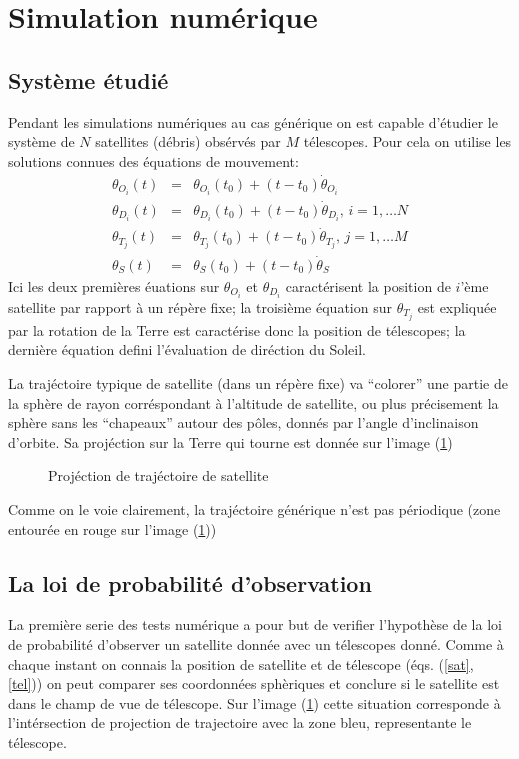 
\section{Simulation numérique}

\subsection{Système étudié}
Pendant les simulations numériques au cas générique on est capable 
d'étudier le système de $N$ satellites (débris) obsérvés par $M$
télescopes. Pour cela on utilise les solutions connues des équations 
de mouvement: 
\begin{eqnarray}
   \theta_{O_i}(t) &=& \theta_{O_i}(t_0) + (t-t_0)\dot \theta_{O_i}  \nonumber \\
   \theta_{D_i}(t) &=& \theta_{D_i}(t_0) + (t-t_0)\dot \theta_{D_i} , \, i = 1, \dots N \label{sat} \\
   \theta_{T_j}(t) &=& \theta_{T_j}(t_0) + (t-t_0)\dot \theta_{T_j} , \, j = 1, \dots M \label{tel} \\
   \theta_S(t) &=& \theta_S(t_0) +  (t-t_0)\dot\theta_S  \label{sun} 
\end{eqnarray}
Ici les deux premières éuations sur $\theta_{O_i}$ et $\theta_{D_i}$ caractérisent 
la position de $i$'ème satellite par rapport à un répère fixe; la troisième équation 
sur $\theta_{T_j}$ est expliquée par la rotation de la Terre est caractérise donc 
la position de télescopes; la dernière équation defini l'évaluation de diréction 
du Soleil. 

La trajéctoire typique de satellite (dans un répère fixe) va ``colorer'' une partie de
la sphère
de rayon corréspondant à l'altitude de satellite, ou plus précisement la sphère
sans les ``chapeaux'' autour des pôles, donnés par l'angle d'inclinaison d'orbite. 
Sa projéction sur la Terre qui tourne est donnée sur l'image (\ref{mks})

 \begin{figure}[htp] \centering
      \caption{
            \label{mks}
Projéction de trajéctoire de satellite}
 \end{figure}
 Comme on le voie clairement, la trajéctoire générique n'est pas périodique
 (zone entourée en rouge sur l'image (\ref{mks}))
 

\subsection{La loi de probabilité d'observation}
La première serie des tests numérique a pour but de verifier
l'hypothèse de la loi de probabilité d'observer un satellite 
donnée avec un télescopes donné. 
Comme à chaque instant on connais la position de satellite et de télescope
(éqs. (\ref{sat}, \ref{tel})) on peut comparer ses coordonnées sphèriques 
et conclure si le satellite est dans le champ de vue de télescope. Sur l'image
(\ref{mks}) cette situation corresponde à l'intérsection de projection de
trajectoire avec la zone bleu, representante le télescope.

